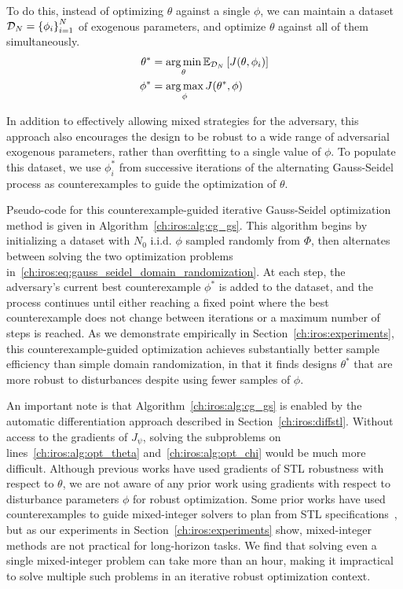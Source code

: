 %
To do this, instead of optimizing $\theta$ against a single $\phi$, we can maintain a dataset $\mathcal{D}_N = \left\{\phi_i\right\}_{i=1}^N$ of exogenous parameters, and optimize $\theta$ against all of them simultaneously.
\begin{subequations}
	\begin{align}\label{ch:iros:eq:gauss_seidel_domain_randomization}
		\theta^* & = \operatorname*{arg\,min}_\theta \mathbb{E}_{\mathcal{D}_N} \left[ J(\theta, \phi_i) \right] \\
		\phi^*   & = \operatorname*{arg\,max}_\phi J(\theta^*, \phi)
	\end{align}
\end{subequations}

In addition to effectively allowing mixed strategies for the adversary, this approach also encourages the design to be robust to a wide range of adversarial exogenous parameters, rather than overfitting to a single value of $\phi$. To populate this dataset, we use $\phi^*_i$ from successive iterations of the alternating Gauss-Seidel process as counterexamples to guide the optimization of $\theta$.

Pseudo-code for this counterexample-guided iterative Gauss-Seidel optimization method is given in Algorithm~\ref{ch:iros:alg:cg_gs}. This algorithm begins by initializing a dataset with $N_0$ i.i.d. $\phi$ sampled randomly from $\Phi$, then alternates between solving the two optimization problems in~\eqref{ch:iros:eq:gauss_seidel_domain_randomization}. At each step, the adversary's current best counterexample $\phi^*$ is added to the dataset, and the process continues until either reaching a fixed point where the best counterexample does not change between iterations or a maximum number of steps is reached. As we demonstrate empirically in Section~\ref{ch:iros:experiments}, this counterexample-guided optimization achieves substantially better sample efficiency than simple domain randomization, in that it finds designs $\theta^*$ that are more robust to disturbances despite using fewer samples of $\phi$.

An important note is that Algorithm~\ref{ch:iros:alg:cg_gs} is enabled by the automatic differentiation approach described in Section~\ref{ch:iros:diffstl}. Without access to the gradients of $J_\psi$, solving the subproblems on lines~\ref{ch:iros:alg:opt_theta} and~\ref{ch:iros:alg:opt_chi} would be much more difficult. Although previous works have used gradients of STL robustness with respect to $\theta$, we are not aware of any prior work using gradients with respect to disturbance parameters $\phi$ for robust optimization. Some prior works have used counterexamples to guide mixed-integer solvers to plan from STL specifications~\cite{raman15}, but as our experiments in Section~\ref{ch:iros:experiments} show, mixed-integer methods are not practical for long-horizon tasks. We find that solving even a single mixed-integer problem can take more than an hour, making it impractical to solve multiple such problems in an iterative robust optimization context.

